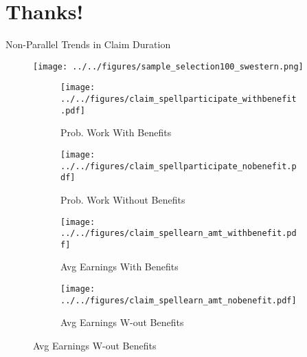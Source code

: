 \documentclass{beamer}
\begin{document}
\section{Thanks!}


\appendix

\begin{frame}{Non-Parallel Trends in Claim Duration}
\begin{figure}
	\texttt{[image: ../../figures/sample\_selection100\_swestern.png]}
\end{figure}	
\end{frame}

\begin{frame}
	\begin{figure} \centering
		\begin{subfigure}{.42\textwidth}\centering\caption{\footnotesize Prob. Work With Benefits}\label{map1}
			\texttt{[image: ../../figures/claim\_spellparticipate\_withbenefit.pdf]}	
		\end{subfigure}
		\begin{subfigure}{.42\textwidth}\centering\caption{\footnotesize Prob. Work Without Benefits}\label{map2}
			\texttt{[image: ../../figures/claim\_spellparticipate\_nobenefit.pdf]}	
		\end{subfigure}
		\begin{subfigure}{.42\textwidth}\centering\caption{\footnotesize Avg Earnings With Benefits}\label{map1}
			\texttt{[image: ../../figures/claim\_spellearn\_amt\_withbenefit.pdf]}	
		\end{subfigure}
		\begin{subfigure}{.42\textwidth}\centering\caption{\footnotesize Avg Earnings W-out Benefits }\label{map2}
			\texttt{[image: ../../figures/claim\_spellearn\_amt\_nobenefit.pdf]}	
		\end{subfigure}
	\end{figure}
\end{frame}
\end{document}
